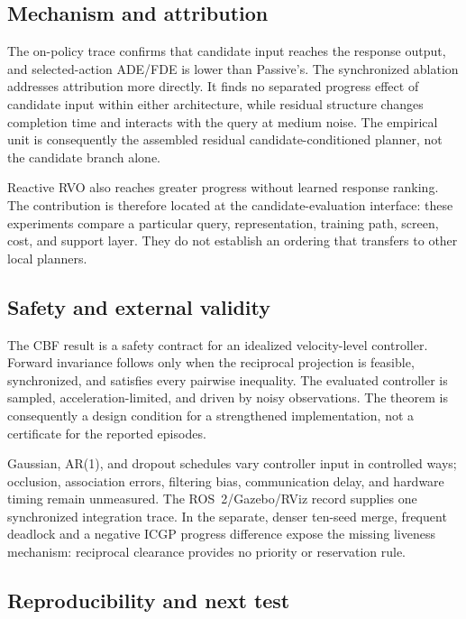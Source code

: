 \documentclass[pdflatex,sn-mathphys-num]{sn-jnl}
\begin{document}
\subsection{Mechanism and attribution}

The on-policy trace confirms that candidate input reaches the response output, and selected-action ADE/FDE is lower than Passive's. The synchronized ablation addresses attribution more directly. It finds no separated progress effect of candidate input within either architecture, while residual structure changes completion time and interacts with the query at medium noise. The empirical unit is consequently the assembled residual candidate-conditioned planner, not the candidate branch alone.

Reactive RVO also reaches greater progress without learned response ranking. The contribution is therefore located at the candidate-evaluation interface: these experiments compare a particular query, representation, training path, screen, cost, and support layer. They do not establish an ordering that transfers to other local planners.

\subsection{Safety and external validity}

The CBF result is a safety contract for an idealized velocity-level controller. Forward invariance follows only when the reciprocal projection is feasible, synchronized, and satisfies every pairwise inequality. The evaluated controller is sampled, acceleration-limited, and driven by noisy observations. The theorem is consequently a design condition for a strengthened implementation, not a certificate for the reported episodes.

Gaussian, AR(1), and dropout schedules vary controller input in controlled ways; occlusion, association errors, filtering bias, communication delay, and hardware timing remain unmeasured. The ROS~2/Gazebo/RViz record supplies one synchronized integration trace. In the separate, denser ten-seed merge, frequent deadlock and a negative ICGP progress difference expose the missing liveness mechanism: reciprocal clearance provides no priority or reservation rule.

\subsection{Reproducibility and next test}
\end{document}

